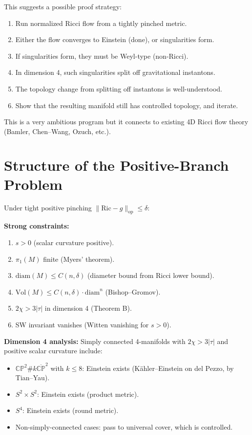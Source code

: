 This suggests a possible proof strategy:
\begin{enumerate}
\item Run normalized Ricci flow from a tightly pinched metric.
\item Either the flow converges to Einstein (done), or singularities form.
\item If singularities form, they must be Weyl-type (non-Ricci).
\item In dimension 4, such singularities split off gravitational instantons.
\item The topology change from splitting off instantons is well-understood.
\item Show that the resulting manifold still has controlled topology, and iterate.
\end{enumerate}

This is a very ambitious program but it connects to existing 4D Ricci flow theory
(Bamler, Chen--Wang, Ozuch, etc.).


\section{Structure of the Positive-Branch Problem}

Under tight positive pinching $\|\mathrm{Ric} - g\|_{\mathrm{op}} \leq \delta$:

\textbf{Strong constraints:}
\begin{enumerate}
\item $s > 0$ (scalar curvature positive).
\item $\pi_1(M)$ finite (Myers' theorem).
\item $\mathrm{diam}(M) \leq C(n, \delta)$ (diameter bound from Ricci lower bound).
\item $\mathrm{Vol}(M) \leq C(n, \delta) \cdot \mathrm{diam}^n$ (Bishop--Gromov).
\item $2\chi > 3|\tau|$ in dimension 4 (Theorem B).
\item SW invariant vanishes (Witten vanishing for $s > 0$).
\end{enumerate}

\textbf{Dimension 4 analysis:}
Simply connected 4-manifolds with $2\chi > 3|\tau|$ and positive scalar curvature include:
\begin{itemize}
\item $\mathbb{CP}^2 \# k\overline{\mathbb{CP}}^2$ with $k \leq 8$: Einstein exists 
      (Kähler--Einstein on del Pezzo, by Tian--Yau).
\item $S^2 \times S^2$: Einstein exists (product metric).
\item $S^4$: Einstein exists (round metric).
\item Non-simply-connected cases: pass to universal cover, which is controlled.
\end{itemize}

